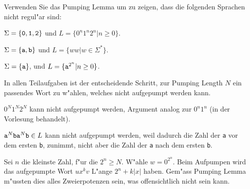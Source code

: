 Verwenden Sie das Pumping Lemma um zu zeigen, dass die folgenden
Sprachen nicht regul"ar sind:
\begin{teilaufgaben}
\item $\Sigma=\{{\tt 0},{\tt 1},{\tt 2}\}$ und $L=\{ 0^n1^n2^n |n\ge 0\}$.
\item $\Sigma=\{{\tt a},{\tt b}\}$ und $L=\{ww|w\in \Sigma^*\}$.
\item $\Sigma=\{{\tt a}\}$, und $L=\{{\tt a}^{2^n}|n\ge 0\}$.
\end{teilaufgaben}

\begin{loesung}
In allen Teilaufgaben ist der entscheidende Schritt, zur Pumping Length
$N$ ein passendes Wort zu w"ahlen, welches nicht aufgepumpt werden kann.
\begin{teilaufgaben}
\item $0^N1^N2^N$ kann nicht aufgepumpt werden, Argument analog zur
$0^n1^n$ (in der Vorlesung behandelt).
\item ${\tt a}^N{\tt ba}^N{\tt b}\in L$ kann nicht aufgepumpt werden,
weil dadurch die Zahl der {\tt a} vor dem ersten {\tt b}, zunimmt,
nicht aber die Zahl der {\tt a} nach dem ersten {\tt b}.
\item
Sei $n$ die kleinste Zahl, f"ur die $2^n\ge N$. W"ahle $w=0^{2^n}$.
Beim Aufpumpen wird das aufgepumpte Wort $ux^kv$ L"ange $2^n+k|x|$
haben. Gem"ass Pumping Lemma m"ussten dies alles Zweierpotenzen sein,
was offensichtlich nicht sein kann.
\end{teilaufgaben}
\end{loesung}
